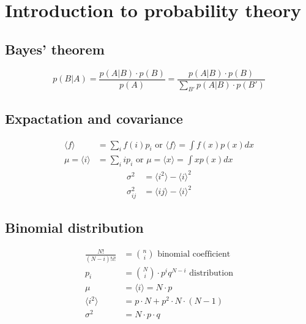 \section{Introduction to probability theory}

\subsection*{Bayes' theorem}

\begin{equation*}
    p(B|A) = \frac{p(A|B) \cdot p(B)}{p(A)} = \frac{p(A|B) \cdot p(B)}{\sum_{B'}p(A|B) \cdot p(B')}
\end{equation*}

\subsection*{Expactation and covariance}

\begin{equation*}
    \begin{aligned}
        \langle f \rangle &= \sum_i f(i)p_i \text{ or } \langle f \rangle = \int f(x) p(x) dx \\
        \mu = \langle i \rangle &= \sum_i i p_i \text{ or } \mu = \langle x \rangle = \int x p(x) dx
    \end{aligned}
\end{equation*}
\begin{equation*}
    \begin{aligned}
        \sigma^2 &= \langle i^2 \rangle - \langle i \rangle^2 \\
        \sigma_{ij}^2 &= \langle ij \rangle - \langle i \rangle^2
    \end{aligned}
\end{equation*}

\subsection*{Binomial distribution}

\begin{equation*}
    \begin{aligned}
        \frac{N!}{(N-i)!i!} &= {n \choose i} \text{  binomial coefficient} \\
        p_i &= {N \choose i} \cdot p^i q^{N-i} \text{  distribution} \\
        \mu &= \langle i \rangle = N \cdot p \\
        \langle i^2 \rangle &= p \cdot N + p^2 \cdot N \cdot (N-1) \\
        \sigma^2 &= N \cdot p \cdot q
    \end{aligned}
\end{equation*}

